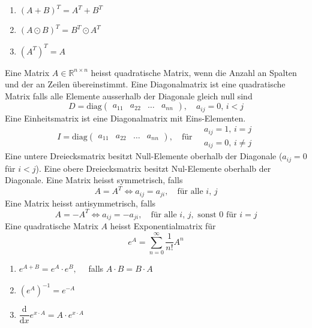 \begin{enumerate}[$(i)$]
\item $\left(A+B\right)^T=A^T+B^T$
\item $\left(A\odot B\right)^T=B^T\odot A^T$
\item $\left(A^T\right)^T=A$
\end{enumerate}
Eine Matrix $A\in\mathbb{R}^{n\times n}$ heisst quadratische Matrix, wenn die Anzahl an Spalten und der an Zeilen übereinstimmt.
\newline\newline
Eine Diagonalmatrix ist eine quadratische Matrix falls alle Elemente ausserhalb der Diagonale gleich null sind
\begin{equation}
\boxed{D=\text{diag}\begin{pmatrix}a_{11}&a_{22}&\dotso&a_{nn}\end{pmatrix},\quad a_{ij}=0, \,i<j}
\end{equation}
Eine Einheitsmatrix ist eine Diagonalmatrix mit Eins-Elementen.
\begin{equation}
\boxed{I=\text{diag}\begin{pmatrix}a_{11}&a_{22}&\dotso&a_{nn}\end{pmatrix},\quad \text{für}\quad \begin{matrix}a_{ij}=1, \,i=j\\a_{ij}=0, \,i\neq j\end{matrix}}
\end{equation}
Eine untere Dreiecksmatrix besitzt Null-Elemente oberhalb der Diagonale ($a_{ij}=0$ für $i<j$). Eine obere Dreiecksmatrix besitzt Nul-Elemente oberhalb der Diagonale.
\newline\newline
Eine Matrix heisst symmetrisch, falls
\begin{equation}
\boxed{A=A^T\Leftrightarrow a_{ij}=a_{ji},\quad \text{für alle }i,\,j}
\end{equation}
Eine Matrix heisst antisymmetrisch, falls
\begin{equation}
\boxed{A=-A^T\Leftrightarrow a_{ij}=-a_{ji},\quad \text{für alle }i,\,j,\text{ sonst }0\text{ für }i=j}
\end{equation}
Eine quadratische Matrix $A$ heisst Exponentialmatrix für
\begin{equation}
\boxed{e^A=\displaystyle \sum_{n=0}^{\infty}\dfrac{1}{n!}A^n}
\end{equation}
\begin{enumerate}[$(i)$]
\item $e^{A+B}=e^A\cdot e^B,\quad $ falls $A\cdot B=B\cdot A$
\item $\left(e^A\right)^{-1}=e^{-A}$
\item $\dfrac{\text{d}}{\text{d}x}e^{x\cdot A}=A\cdot e^{x\cdot A}$
\end{enumerate}
